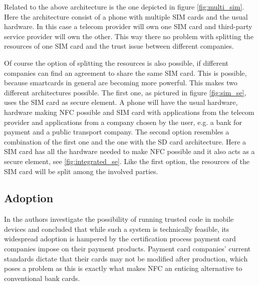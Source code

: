 Related to the above architecture is the one depicted in figure \ref{fig:multi_sim}.
Here the architecture consist of a phone with multiple SIM cards and the usual hardware.
In this case a telecom provider will own one SIM card and third-party service provider will own the other.
This way there no problem with splitting the resources of one SIM card and the trust issue between different companies.

Of course the option of splitting the resources is also possible, if different companies can find an agreement to share the same SIM card.
This is possible, because smartcards in general are becoming more powerful.
This makes two different architectures possible.
The first one, as pictured in figure \ref{fig:sim_se}, uses the SIM card as secure element.
A phone will have the usual hardware, hardware making NFC possible and SIM card with applications from the telecom provider and applications from a company chosen by the user, e.g. a bank for payment and a public transport company. 
The second option resembles a combination of the first one and the one with the SD card architecture.
Here a SIM card has all the hardware needed to make NFC possible and it also acts as a secure element, see \ref{fig:integrated_se}.
Like the first option, the resources of the SIM card will be split among the involved parties.



\subsection{Adoption}
In \cite{1497411} the authors investigate the possibility of running trusted code in mobile devices and concluded that while such a system is technically feasible, its widespread adoption is hampered by the certification process payment card companies impose on their payment products.
Payment card companies' current standards dictate that their cards may not be modified after production, which poses a problem as this is exactly what makes NFC an enticing alternative to conventional bank cards.


